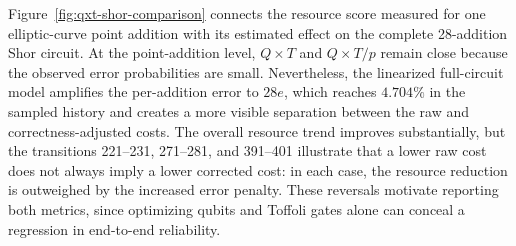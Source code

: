 Figure~\ref{fig:qxt-shor-comparison} connects the resource score measured for
one elliptic-curve point addition with its estimated effect on the complete
28-addition Shor circuit. At the point-addition level, $Q\!\times\!T$ and
$Q\!\times\!T/p$ remain close because the observed error probabilities are
small. Nevertheless, the linearized full-circuit model amplifies the
per-addition error to $28e$, which reaches $4.704\%$ in the sampled history and
creates a more visible separation between the raw and correctness-adjusted
costs. The overall resource trend improves substantially, but the transitions
221--231, 271--281, and 391--401 illustrate that a lower raw cost does not
always imply a lower corrected cost: in each case, the resource reduction is
outweighed by the increased error penalty. These reversals motivate reporting
both metrics, since optimizing qubits and Toffoli gates alone can conceal a
regression in end-to-end reliability.
